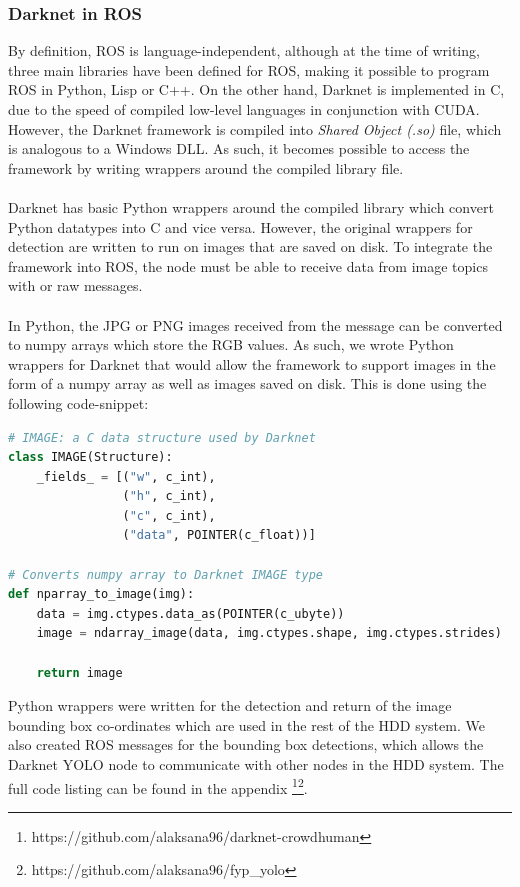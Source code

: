 \subsubsection{Darknet in ROS}
By definition, ROS is language-independent, although at the time of writing, three main libraries have been defined for ROS, making it possible to program ROS in Python, Lisp or C++. On the other hand, Darknet is implemented in C, due to the speed of compiled low-level languages in conjunction with CUDA. However, the Darknet framework is compiled into \textit{Shared Object (.so)} file, which is analogous to a Windows DLL. As such, it becomes possible to access the framework by writing wrappers around the compiled library file.

\paragraph{}Darknet has basic Python wrappers around the compiled library which convert Python datatypes into C and vice versa. However, the original wrappers for detection are written to run on images that are saved on disk. To integrate the framework into ROS, the node must be able to receive data from image topics with  or raw  messages.

\paragraph{}In Python, the JPG or PNG images received from the  message can be converted to numpy arrays which store the RGB values. As such, we wrote Python wrappers for Darknet that would allow the framework to support images in the form of a numpy array as well as images saved on disk. This is done using the following code-snippet:

\begin{lstlisting}[language=Python]
# IMAGE: a C data structure used by Darknet
class IMAGE(Structure): 
	_fields_ = [("w", c_int),
				("h", c_int),
				("c", c_int),
				("data", POINTER(c_float))]
				
# Converts numpy array to Darknet IMAGE type
def nparray_to_image(img): 
	data = img.ctypes.data_as(POINTER(c_ubyte))
	image = ndarray_image(data, img.ctypes.shape, img.ctypes.strides)

	return image
\end{lstlisting}

Python wrappers were written for the detection and return of the image bounding box co-ordinates which are used in the rest of the HDD system. We also created ROS messages for the bounding box detections, which allows the Darknet YOLO node to communicate with other nodes in the HDD system. The full code listing can be found in the appendix \footnote{https://github.com/alaksana96/darknet-crowdhuman}\footnote{https://github.com/alaksana96/fyp\_yolo}.

